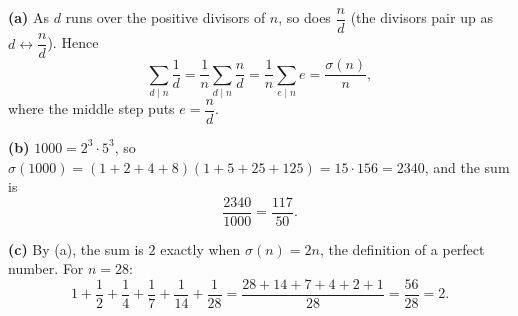 \textbf{(a)} As $d$ runs over the positive divisors of $n$, so does $\dfrac {n}{d}$ (the divisors pair up as $d\leftrightarrow\dfrac {n}{d}$). Hence
\[\sum_{d\mid n}\dfrac{1}{d}=\dfrac{1}{n}\sum_{d\mid n}\dfrac {n}{d}=\dfrac{1}{n}\sum_{e\mid n}e=\dfrac{\sigma(n)}{n},\]
where the middle step puts $e=\dfrac {n}{d}$.

\textbf{(b)} $1000=2^3\cdot5^3$, so $\sigma(1000)=(1+2+4+8)(1+5+25+125)=15\cdot156=2340$, and the sum is
\[\dfrac{2340}{1000}=\boxed{\dfrac{117}{50}}.\]

\textbf{(c)} By (a), the sum is $2$ exactly when $\sigma(n)=2n$, the definition of a perfect number. For $n=28$:
\[1+\dfrac{1}{2}+\dfrac{1}{4}+\dfrac{1}{7}+\dfrac{1}{14}+\dfrac{1}{28}=\dfrac{28+14+7+4+2+1}{28}=\dfrac{56}{28}=2 .\]

